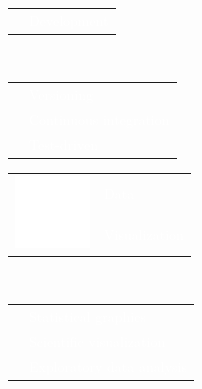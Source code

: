 \documentclass[letterpaper]{article}
\begin{document}
\begin{minipage}[t]{1.\linewidth}
\begin{minipage}{0.47\linewidth}
{\begin{minipage}{1\linewidth}
\begin{minipage}{1\linewidth}
\begin{minipage}[t]{0.47\linewidth}
\begin{minipage}{1\linewidth}
\begin{tabularx}{1\textwidth}{rX}
					& \large\textmd{\textcolor{white}{Development}}\\
				\end{tabularx}\\
			\end{minipage}
			\begin{minipage}{1\linewidth}
				\vspace{1ex}
				{\small
				\begin{tabularx}{1\textwidth}{rX}
					& \textcolor{white}{Versioning}\\
				 	& \textcolor{white}{Continuous integration}\\
				 	& \textcolor{white}{Test-driven}\\				 	
				\end{tabularx}
				}
			\end{minipage}
		\end{minipage}		
		\hfill
		\begin{minipage}[t]{0.47\linewidth}
			\begin{tabularx}{1\textwidth}{rX}
				\multirow{2}{*}{\includegraphics[width=0.18\linewidth]{visualize.eps}}
				 & \large\textmd{\textcolor{white}{Data}}\\
				 & \large\textmd{\textcolor{white}{Visualization}}\\
			\end{tabularx}\\
			\begin{minipage}{1\linewidth}
				\vspace{1ex}
				{\small
				\begin{tabularx}{1\textwidth}{rX}
					& \textcolor{white}{Statistical graphics}\\
				 	& \textcolor{white}{Scientific visualization}\\
				 	& \textcolor{white}{Exploratory data 
				 	analysis}\\				 	
				\end{tabularx}\\
				}
			\end{minipage}			
		\vspace{1ex}
		\end{minipage}
	\end{minipage} %

\end{minipage}}
\end{minipage}
\end{minipage}
\end{document}
